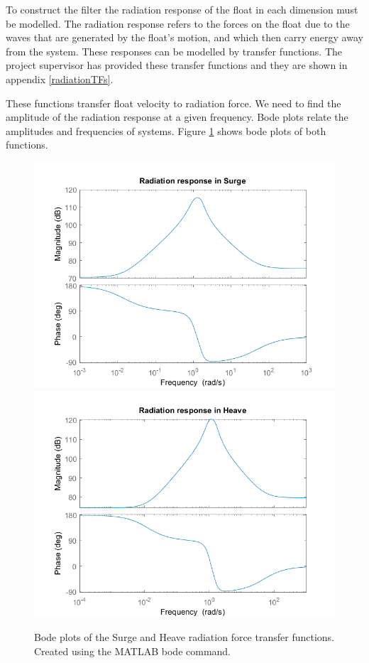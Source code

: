 \documentclass{report}
\begin{document}
To construct the filter the radiation response of the float in each dimension must be modelled. The radiation response refers to the forces on the float due to the waves that are generated by the float's motion, and which then carry energy away from the system. These responses can be modelled by transfer functions. The project supervisor has provided these transfer functions and they are shown in appendix \ref{radiationTFs}.

These functions transfer float velocity to radiation force. We need to find the amplitude of the radiation response at a given frequency. Bode plots relate the amplitudes and frequencies of systems. Figure \ref{bodePlots} shows bode plots of both functions.

\begin{figure}
\centering
\includegraphics[scale=0.5]{graphs/radiationBodeSurge}
\includegraphics[scale=0.5]{graphs/radiationBodeHeave}
\caption{Bode plots of the Surge and Heave radiation force transfer functions. Created using the MATLAB bode command.	}
\label{bodePlots}
\end{figure} 
\FloatBarrier
\end{document}
